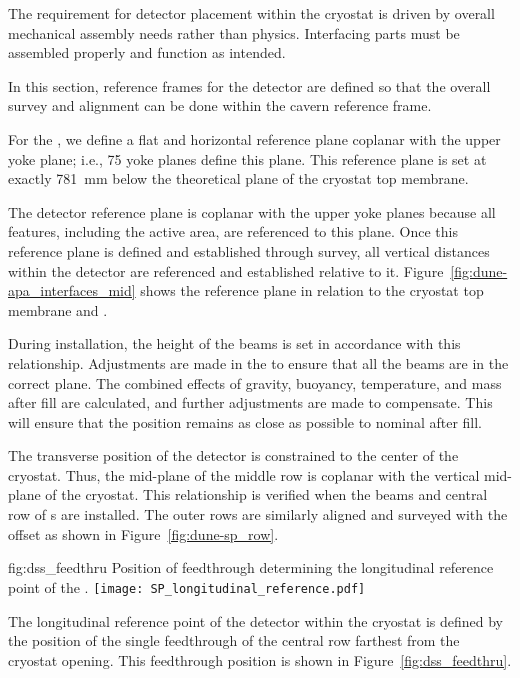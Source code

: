 The requirement for detector placement within the cryostat is driven
by overall mechanical assembly needs rather than physics.
Interfacing parts must be assembled properly and function as intended.


In this section, reference frames for the detector are defined so that the
overall survey and alignment can be done within the cavern reference
frame.

For the , we define a flat and horizontal reference plane
coplanar with the upper  yoke plane; i.e., 75 yoke planes
define this plane. This reference plane is set at exactly \SI{781}{mm}
below the theoretical plane of the cryostat top membrane.


The detector reference plane is coplanar with the upper 
yoke planes because all features, including the active area, are
referenced to this plane. Once this reference plane is defined and
established through survey, all vertical distances within the detector
are referenced and established relative to it.
Figure~\ref{fig:dune-apa_interfaces_mid} shows the reference plane in
relation to the cryostat top membrane and .


During installation, the height of the  beams is set in
accordance with this relationship. Adjustments are made in the
 to ensure that all the beams are in the correct plane. The
combined effects of gravity, buoyancy, temperature, and 
mass after fill are calculated, and further adjustments are made to
compensate.  This will ensure that the  position remains as
close as possible to nominal after fill.


The transverse position of the detector is constrained to the center
of the cryostat. Thus, the mid-plane of the middle row  is
coplanar with the vertical mid-plane of the cryostat. This
relationship is verified when the  beams and central row of
s are installed. The outer rows are similarly aligned and
surveyed with the offset as shown in Figure~\ref{fig:dune-sp_row}.
\begin{dunefigure}{fig:dss_feedthru}
  {Position of feedthrough determining the longitudinal reference point of the .}
  \texttt{[image: SP\_longitudinal\_reference.pdf]}
\end{dunefigure}


The longitudinal reference point of the detector within the cryostat
is defined by the position of the single feedthrough of the central row
farthest from the cryostat opening. This feedthrough position
is shown in Figure~\ref{fig:dss_feedthru}.


